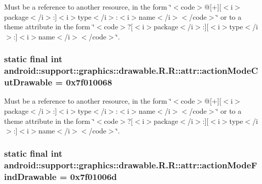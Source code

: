 Must be a reference to another resource, in the form \char`\"{}$<$code$>$@\mbox{[}+\mbox{]}\mbox{[}$<$i$>$package$<$/i$>$:\mbox{]}$<$i$>$type$<$/i$>$:$<$i$>$name$<$/i$>$$<$/code$>$\char`\"{} or to a theme attribute in the form \char`\"{}$<$code$>$?\mbox{[}$<$i$>$package$<$/i$>$:\mbox{]}\mbox{[}$<$i$>$type$<$/i$>$:\mbox{]}$<$i$>$name$<$/i$>$$<$/code$>$\char`\"{}. \hypertarget{classandroid_1_1support_1_1graphics_1_1drawable_1_1_r_1_1attr_fc98fcc819d03b43726ceaa73573c145}{
\subsubsection[{actionModeCutDrawable}]{\setlength{\rightskip}{0pt plus 5cm}static final int android::support::graphics::drawable.R.R::attr::actionModeCutDrawable = 0x7f010068}}
\label{classandroid_1_1support_1_1graphics_1_1drawable_1_1_r_1_1attr_fc98fcc819d03b43726ceaa73573c145}


Must be a reference to another resource, in the form \char`\"{}$<$code$>$@\mbox{[}+\mbox{]}\mbox{[}$<$i$>$package$<$/i$>$:\mbox{]}$<$i$>$type$<$/i$>$:$<$i$>$name$<$/i$>$$<$/code$>$\char`\"{} or to a theme attribute in the form \char`\"{}$<$code$>$?\mbox{[}$<$i$>$package$<$/i$>$:\mbox{]}\mbox{[}$<$i$>$type$<$/i$>$:\mbox{]}$<$i$>$name$<$/i$>$$<$/code$>$\char`\"{}. \hypertarget{classandroid_1_1support_1_1graphics_1_1drawable_1_1_r_1_1attr_c49c7522ce3bf5df0d6aa2e8052067ac}{
\subsubsection[{actionModeFindDrawable}]{\setlength{\rightskip}{0pt plus 5cm}static final int android::support::graphics::drawable.R.R::attr::actionModeFindDrawable = 0x7f01006d}}
\label{classandroid_1_1support_1_1graphics_1_1drawable_1_1_r_1_1attr_c49c7522ce3bf5df0d6aa2e8052067ac}


